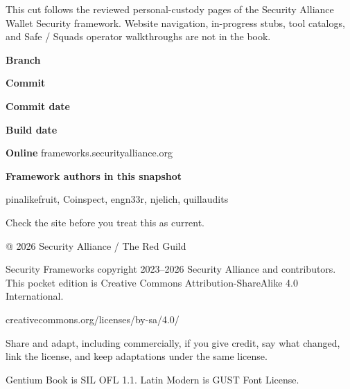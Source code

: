 \clearpage
{}
\begingroup
\setlength{\parskip}{0.85mm}
\fontsize{8}{10}\selectfont
{}

This cut follows the reviewed personal-custody pages of
the Security Alliance Wallet Security framework. Website
navigation, in-progress stubs, tool catalogs, and Safe /
Squads operator walkthroughs are not in the book.

\vspace{1mm}
\textbf{Branch} \quad \texttt{\SourceRef}

\textbf{Commit} \quad \SourceCommit

\textbf{Commit date} \quad \SourceCommitDate

\textbf{Build date} \quad \BuildDate

\textbf{Online} \quad frameworks.securityalliance.org

\textbf{Framework authors in this snapshot}

pinalikefruit, Coinspect, engn33r, njelich, quillaudits

\vspace{0.4mm}
Check the site before you treat this as current.
\endgroup

\clearpage
{}
\begingroup
\setlength{\parskip}{1.1mm}
\vspace*{2mm}
{\fontsize{9}{11}\selectfont @ 2026 Security Alliance / The Red Guild\par}
\vspace{2.5mm}
\fontsize{8}{10}\selectfont

Security Frameworks copyright 2023--2026 Security
Alliance and contributors. This pocket edition is
Creative Commons Attribution-ShareAlike 4.0
International.

creativecommons.org/licenses/by-sa/4.0/

Share and adapt, including commercially, if you give
credit, say what changed, link the license, and keep
adaptations under the same license.

Gentium Book is SIL OFL 1.1. Latin Modern is GUST Font
License.

\clearpage
\endgroup
